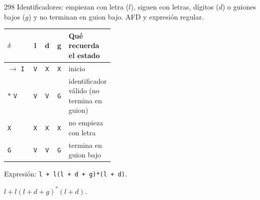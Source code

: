 \documentclass[11pt]{article}
\begin{document}
\begin{ejercicio}{298}{}
Identificadores: empiezan con letra ($l$), siguen con letras, dígitos ($d$) o guiones bajos ($g$) y no terminan en guion bajo. AFD y expresión regular.
\end{ejercicio}
\proc \begin{center}\small\begin{tabular}{lcccp{0.42\linewidth}}\toprule
$\delta$ & l & d & g & Qué recuerda el estado \\\midrule
$\to$ \texttt{I} & \texttt{V} & \texttt{X} & \texttt{X} & inicio \\
$*$ \texttt{V} & \texttt{V} & \texttt{V} & \texttt{G} & identificador válido (no termina en guion) \\
 \texttt{X} & \texttt{X} & \texttt{X} & \texttt{X} & no empieza con letra \\
 \texttt{G} & \texttt{V} & \texttt{V} & \texttt{G} & termina en guion bajo \\
\bottomrule\end{tabular}\end{center}
\par Expresión: \texttt{l + l(l + d + g)*(l + d)}.

\resp $l + l(l + d + g)^*(l + d)$.
\end{document}
